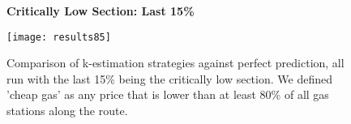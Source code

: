 \begin{figure}
\centering
\textbf{Critically Low Section: Last 15\%}\par\medskip
\texttt{[image: results85]}
\caption{Comparison of k-estimation strategies against perfect prediction, all run with the last 15\% being the critically low section. We defined 'cheap gas' as any price that is lower than at least 80\% of all gas stations along the route.}
\label{fig:results85}
\end{figure}

